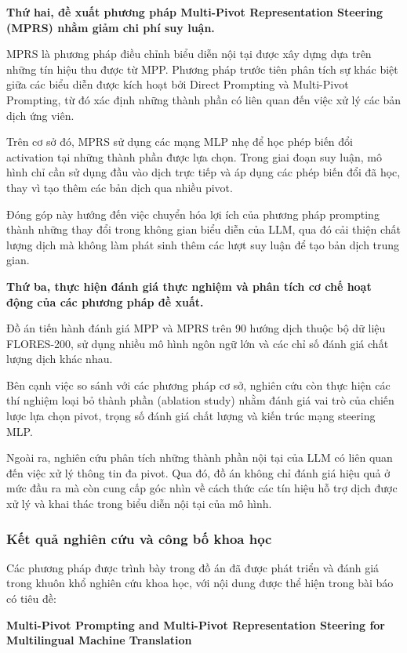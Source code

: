 \textbf{Thứ hai, đề xuất phương pháp Multi-Pivot Representation Steering (MPRS) nhằm giảm chi phí suy luận.}

MPRS là phương pháp điều chỉnh biểu diễn nội tại được xây dựng dựa trên những tín hiệu thu được từ MPP. Phương pháp trước tiên phân tích sự khác biệt giữa các biểu diễn được kích hoạt bởi Direct Prompting và Multi-Pivot Prompting, từ đó xác định những thành phần có liên quan đến việc xử lý các bản dịch ứng viên.

Trên cơ sở đó, MPRS sử dụng các mạng MLP nhẹ để học phép biến đổi activation tại những thành phần được lựa chọn. Trong giai đoạn suy luận, mô hình chỉ cần sử dụng đầu vào dịch trực tiếp và áp dụng các phép biến đổi đã học, thay vì tạo thêm các bản dịch qua nhiều pivot.

Đóng góp này hướng đến việc chuyển hóa lợi ích của phương pháp prompting thành những thay đổi trong không gian biểu diễn của LLM, qua đó cải thiện chất lượng dịch mà không làm phát sinh thêm các lượt suy luận để tạo bản dịch trung gian.

\textbf{Thứ ba, thực hiện đánh giá thực nghiệm và phân tích cơ chế hoạt động của các phương pháp đề xuất.}

Đồ án tiến hành đánh giá MPP và MPRS trên 90 hướng dịch thuộc bộ dữ liệu FLORES-200, sử dụng nhiều mô hình ngôn ngữ lớn và các chỉ số đánh giá chất lượng dịch khác nhau.

Bên cạnh việc so sánh với các phương pháp cơ sở, nghiên cứu còn thực hiện các thí nghiệm loại bỏ thành phần (ablation study) nhằm đánh giá vai trò của chiến lược lựa chọn pivot, trọng số đánh giá chất lượng và kiến trúc mạng steering MLP.

Ngoài ra, nghiên cứu phân tích những thành phần nội tại của LLM có liên quan đến việc xử lý thông tin đa pivot. Qua đó, đồ án không chỉ đánh giá hiệu quả ở mức đầu ra mà còn cung cấp góc nhìn về cách thức các tín hiệu hỗ trợ dịch được xử lý và khai thác trong biểu diễn nội tại của mô hình.

\subsubsection{Kết quả nghiên cứu và công bố khoa học}

Các phương pháp được trình bày trong đồ án đã được phát triển và đánh giá trong khuôn khổ nghiên cứu khoa học, với nội dung được thể hiện trong bài báo có tiêu đề:

\begin{center}
    \textbf{Multi-Pivot Prompting and Multi-Pivot Representation Steering for Multilingual Machine Translation}
\end{center}

